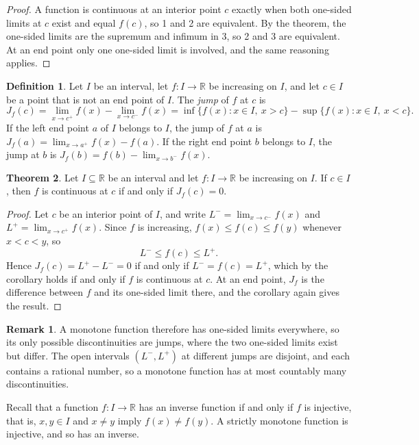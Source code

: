 \documentclass[11pt,a4paper]{article}
\numberwithin{equation}{section}
\theoremstyle{definition}
\newtheorem{thm}{Theorem}[subsection]
\newtheorem{defn}[thm]{Definition}
\newtheorem*{remark}{Remark}
\begin{document}
\begin{proof}
A function is continuous at an interior point $c$ exactly when both one-sided limits at $c$ exist and equal $f(c)$, so 1 and 2 are equivalent. By the theorem, the one-sided limits are the supremum and infimum in 3, so 2 and 3 are equivalent. At an end point only one one-sided limit is involved, and the same reasoning applies.
\end{proof}


\begin{defn}
Let $I$ be an interval, let $f: I\longrightarrow \mathbb{R}$ be increasing on $I$, and let $c\in I$ be a point that is not an end point of $I$. The \emph{jump} of $f$ at $c$ is
$$J_f(c) = \lim_{x\rightarrow c^+} f(x)  - \lim_{x\rightarrow c^-} f(x) = \inf\{f(x): x\in I,\ x>c\} - \sup \{f(x): x\in I,\ x < c\}.$$
If the left end point $a$ of $I$ belongs to $I$, the jump of $f$ at $a$ is $J_f(a) = \lim_{x\rightarrow a^+} f(x) - f(a)$. If the right end point $b$ belongs to $I$, the jump at $b$ is $J_f(b) = f(b) - \lim_{x\rightarrow b^-} f(x).$
\end{defn}


\begin{thm}
Let $I\subseteq \mathbb{R}$ be an interval and let $f: I\longrightarrow \mathbb{R}$ be increasing on $I$. If $c\in I$, then $f$ is continuous at $c$ if and only if $J_f(c) = 0$.
\end{thm}

\begin{proof}
Let $c$ be an interior point of $I$, and write $L^- = \lim_{x\rightarrow c^-}f(x)$ and $L^+ = \lim_{x\rightarrow c^+}f(x)$. Since $f$ is increasing, $f(x)\leq f(c)\leq f(y)$ whenever $x<c<y$, so
$$L^-\leq f(c)\leq L^+ .$$
Hence $J_f(c) = L^+ - L^- = 0$ if and only if $L^- = f(c) = L^+$, which by the corollary holds if and only if $f$ is continuous at $c$. At an end point, $J_f$ is the difference between $f$ and its one-sided limit there, and the corollary again gives the result.
\end{proof}

\begin{remark}
A monotone function therefore has one-sided limits everywhere, so its only possible discontinuities are jumps, where the two one-sided limits exist but differ. The open intervals $(L^-, L^+)$ at different jumps are disjoint, and each contains a rational number, so a monotone function has at most countably many discontinuities.
\end{remark}

Recall that a function $f: I\longrightarrow \mathbb{R}$ has an inverse function if and only if $f$ is injective, that is, $x, y\in I$ and $x\neq y$ imply $f(x) \neq f(y)$. A strictly monotone function is injective, and so has an inverse.
\end{document}
